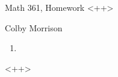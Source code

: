 \documentclass[12pt, twoside]{amsart}
\begin{document}
\centerline{\large \sc Math 361, Homework <++>}
\centerline{\large  Colby Morrison}
\begin{enumerate}
  \item <++> 
\end{enumerate}<++>
\end{document}
